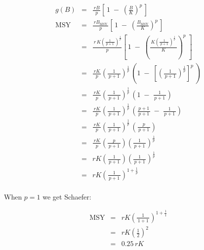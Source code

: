 \documentclass[fleqn]{article}
\newcommand{\MSY}{\mathrm{MSY}}
\newcommand{\msy}{_\mathrm{MSY}}
\begin{document}
\begin{eqnarray*}
  g(B) &=& \frac{\,rB\,}{p}\!
  \left[\,1 \;-\; \left(\frac{B}{K}\right)^{\!p}\,\right]                \\[1em]
  \MSY &=& \frac{\,rB\msy\,}{p}\!
  \left[\,1 \;-\; \left(\frac{B\msy}{K}\right)^{\!p}\,\right]            \\[1em]
  ~    &=&
  \frac{\,r\,K\!\left(\!\frac{1}{\,p+1\,}\!\right)^{\!\frac{1}{p}}}{p}
  \left[\,1 \;-\; \left(\!\frac{\,K\!
        \left(\!\frac{1}{\,p+1\,}\!\right)^{\!\frac{1}{p}}\,}{K}\!\right)
    ^{\!p}\;\right]                                                      \\[1em]
  ~    &=& \frac{\,rK\,}{p}\!
  \left(\!\frac{1}{\,p\!+\!1\,}\!\right)^{\!\frac{1}{p}}\,
  \left(1 \;-\; \left[\left(\!\frac{1}{\,p+1\,}\!\right)
      ^{\!\frac{1}{p}}\right]^{\!p}\;\right)                             \\[1em]
  ~    &=& \frac{\,rK\,}{p}\!
  \left(\!\frac{1}{\,p\!+\!1\,}\!\right)^{\!\frac{1}{p}}\,
  \left(1 \;-\; \!\frac{1}{\,p+1\,}\!\right)                             \\[1em]
  ~    &=& \frac{\,rK\,}{p}\!
  \left(\!\frac{1}{\,p\!+\!1\,}\!\right)^{\!\frac{1}{p}}\,
  \left(\frac{\,p+1\,}{p+1} \;-\; \!\frac{1}{\,p+1\,}\!\right)           \\[1em]
  ~    &=& \frac{\,rK\,}{p}\!
  \left(\!\frac{1}{\,p\!+\!1\,}\!\right)^{\!\frac{1}{p}}\,
  \left(\!\frac{p}{\,p+1\,}\!\right)                                     \\[1em]
  ~    &=& \frac{\,rK\,}{p}\!\left(\!\frac{p}{\,p+1\,}\!\right)\!
  \left(\!\frac{1}{\,p\!+\!1\,}\!\right)^{\!\frac{1}{p}}                 \\[1em]
  ~    &=& rK\!\left(\!\frac{1}{\,p\!+\!1\,}\!\right)\!
  \left(\!\frac{1}{\,p+1\,}\!\right)^{\!\frac{1}{p}}                     \\[1em]
  ~    &=& rK\!\left(\!\frac{1}{\,p+1\,}\!\right)^{\!1+\frac{1}{p}}      \\[1ex]
\end{eqnarray*}

When $p\!=\!1$ we get Schaefer:

\begin{eqnarray*}
  \MSY &=& rK\left(\!\frac{1}{\,1+1\,}\!\right)^{\!1+\frac{1}{1}}\\[1em]
  ~    &=& rK\left(\frac{1}{2}\right)^{\!2}                      \\[1em]
  ~    &=& 0.25\,rK
\end{eqnarray*}
\end{document}
